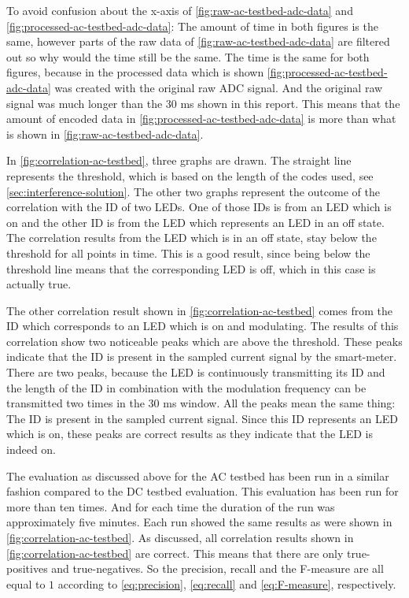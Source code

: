 To avoid confusion about the x-axis of \autoref{fig:raw-ac-testbed-adc-data} and \autoref{fig:processed-ac-testbed-adc-data}: The amount of time in both figures is the same, however parts of the raw data of \autoref{fig:raw-ac-testbed-adc-data} are filtered out so why would the time still be the same.
The time is the same for both figures, because in the processed data which is shown \autoref{fig:processed-ac-testbed-adc-data} was created with the original raw ADC signal.
And the original raw signal was much longer than the 30 ms shown in this report.
This means that the amount of encoded data in \autoref{fig:processed-ac-testbed-adc-data} is more than what is shown in \autoref{fig:raw-ac-testbed-adc-data}.



In \autoref{fig:correlation-ac-testbed}, three graphs are drawn.
The straight line represents the threshold, which is based on the length of the codes used, see \autoref{sec:interference-solution}.
The other two graphs represent the outcome of the correlation with the ID of two LEDs.
One of those IDs is from an LED which is on and the other ID is from the LED which represents an LED in an off state.
The correlation results from the LED which is in an off state, stay below the threshold for all points in time.
This is a good result, since being below the threshold line means that the corresponding LED is off, which in this case is actually true.

The other correlation result shown in \autoref{fig:correlation-ac-testbed} comes from the ID which corresponds to an LED which is on and modulating.
The results of this correlation show two noticeable peaks which are above the threshold.
These peaks indicate that the ID is present in the sampled current signal by the smart-meter.
There are two peaks, because the LED is continuously transmitting its ID and the length of the ID in combination with the modulation frequency can be transmitted two times in the 30 ms window.
All the peaks mean the same thing: The ID is present in the sampled current signal.
Since this ID represents an LED which is on, these peaks are correct results as they indicate that the LED is indeed on.

The evaluation as discussed above for the AC testbed has been run in a similar fashion compared to the DC testbed evaluation.
This evaluation  has been run for more than ten times.
And for each time the duration of the run was approximately five minutes.
Each run showed the same results as were shown in \autoref{fig:correlation-ac-testbed}.
As discussed, all correlation results shown in \autoref{fig:correlation-ac-testbed} are correct.
This means that there are only true-positives and true-negatives.
So the precision, recall and the F-measure are all equal to $1$ according to \autoref{eq:precision}, \autoref{eq:recall} and \autoref{eq:F-measure}, respectively.

